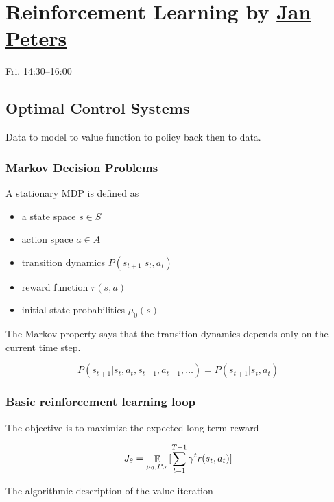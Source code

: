 \chapter{Reinforcement Learning by \href{http://www.jan-peters.net/}{Jan Peters}}

Fri. 14:30--16:00

\section{Optimal Control Systems}

Data to model to value function to policy back then to data.

\subsection{Markov Decision Problems}

A stationary MDP is defined as

\begin{itemize}
  \item a state space $s \in S$
  \item action space $a \in A$
  \item transition dynamics $P(s_{t+1}| s_t, a_t)$
  \item reward function $r(s,a)$
  \item initial state probabilities $\mu_0(s)$
\end{itemize}

The Markov property says that the transition dynamics depends only on the
current time step.

\begin{equation}
  P(s_{t+1}|s_t, a_t, s_{t-1}, a_{t-1}, \dots) = P(s_{t+1}|s_t, a_t)
\end{equation}


\subsection{Basic reinforcement learning loop}

The objective is to maximize the expected long-term reward

\begin{equation}
  J_\theta = \operatorname*{\mathbb{\mathop{E}}}_{\mu_0, P, \pi} [\sum_{t=1}^{T-1}\gamma^t r(s_t, a_t)]
\end{equation}

The algorithmic description of the value iteration

